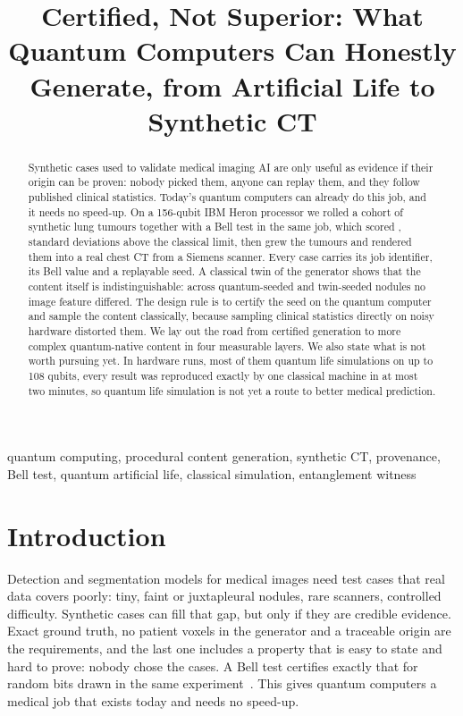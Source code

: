\documentclass[conference]{IEEEtran}
\begin{document}
\title{Certified, Not Superior: What Quantum Computers Can Honestly Generate, from Artificial Life to Synthetic CT}

\author{
}

\maketitle

\begin{abstract}
Synthetic cases used to validate medical imaging AI are only useful as evidence if their origin can be proven:
nobody picked them, anyone can replay them, and they follow published clinical statistics. Today's quantum
computers can already do this job, and it needs no speed-up. On a 156-qubit IBM Heron processor we rolled a cohort
of synthetic lung tumours together with a Bell test in the same job, which scored \chshS{}, \chshZ{} standard
deviations above the classical limit, then grew the tumours and rendered them into a real chest CT from a Siemens
scanner. Every case carries its job identifier, its Bell value and a replayable seed. A classical twin of the
generator shows that the content itself is indistinguishable: across \renderNq{} quantum-seeded and \renderNt{}
twin-seeded nodules no image feature differed. The design rule is to certify the seed on the quantum computer and
sample the content classically, because sampling clinical statistics directly on noisy hardware distorted them. We
lay out the road from certified generation to more complex quantum-native content in four measurable layers. We
also state what is not worth pursuing yet. In \nHwRunFiles{} hardware runs, most of them quantum life simulations
on up to 108 qubits, every result was reproduced exactly by one classical machine in at most two minutes, so
quantum life simulation is not yet a route to better medical prediction.
\end{abstract}

\begin{IEEEkeywords}
quantum computing, procedural content generation, synthetic CT, provenance, Bell test, quantum artificial life,
classical simulation, entanglement witness
\end{IEEEkeywords}

\section{Introduction}
Detection and segmentation models for medical images need test cases that real data covers poorly: tiny, faint or
juxtapleural nodules, rare scanners, controlled difficulty. Synthetic cases can fill that gap, but only if they are
credible evidence. Exact ground truth, no patient voxels in the generator and a traceable origin are the
requirements, and the last one includes a property that is easy to state and hard to prove: nobody chose the cases.
A Bell test certifies exactly that for random bits drawn in the same experiment~\cite{clauser1969,pironio2010}.
This gives quantum computers a medical job that exists today and needs no speed-up.
\end{document}

